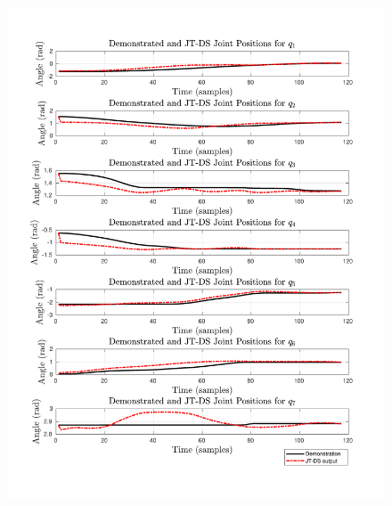 \documentclass{article}
\begin{document}
\begin{enumerate}
\begin{figure}[!th] 
  \begin{minipage}{0.5\textwidth}
     	\centering 
     	\includegraphics[trim={1.2cm 1.5cm 1.7cm 1.5cm},clip,width=\linewidth]{../../src/JTDS_mat_lib/figures/jtd_pos_pour1.pdf}
  \end{minipage}
    \begin{minipage}{0.5\textwidth}
       	\centering 

\end{minipage}
\end{figure}
\end{enumerate}
\end{document}
